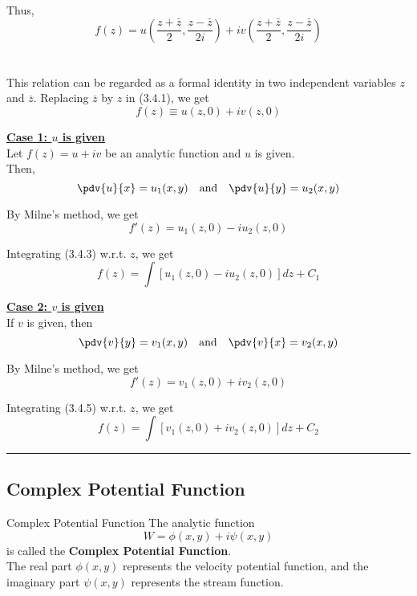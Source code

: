 Thus,
\begin{equation}
    f(z) = u\left( \frac{z + \bar{z}}{2}, \frac{z - \bar{z}}{2i} \right) + iv\left( \frac{z + \bar{z}}{2}, \frac{z - \bar{z}}{2i} \right)
\end{equation} \\~\\

This relation can be regarded as a formal identity in two independent variables $z$ and $\overline{z}$. Replacing $\overline{z}$ by $z$ in (3.4.1), we get
\begin{equation}
    \boxed{ f(z) \equiv u(z,0) + iv(z,0) }
\end{equation}

\underline{\textbf{Case 1: $u$ is given}} \\
Let $f(z) = u + iv$ be an analytic function and $u$ is given. \\
Then, \[
    \pdv{u}{x} = u_1(x,y) \quad \text{and} \quad \pdv{u}{y} = u_2(x,y)
\] 

By Milne's method, we get
\begin{equation}
    f'(z) = u_1(z,0) - iu_2(z,0)
\end{equation} 

Integrating (3.4.3) w.r.t. $z$, we get
\begin{equation}
    f(z) = \int \left[ u_1(z,0) - iu_2(z,0) \right] dz + C_1
\end{equation}

\underline{\textbf{Case 2: $v$ is given}} \\
If $v$ is given, then \[
    \pdv{v}{y} = v_1(x,y) \quad \text{and} \quad \pdv{v}{x} = v_2(x,y)
\] 

By Milne's method, we get
\begin{equation}
    f'(z) = v_1(z,0) + iv_2(z,0)
\end{equation}

Integrating (3.4.5) w.r.t. $z$, we get
\begin{equation}
    f(z) = \int \left[ v_1(z,0) + iv_2(z,0) \right] dz + C_2
\end{equation}

\vspace{20pt}\rule{3in}{1pt}


\subsection{Complex Potential Function}
\begin{definition}{Complex Potential Function}{}
    The analytic function  \[
        W = \phi(x,y) + i\psi(x,y)
    \] is called the \textbf{Complex Potential Function}. \\
    The real part $\phi(x,y)$ represents the velocity potential function, and the imaginary part $\psi(x,y)$ represents the stream function.
\end{definition}

